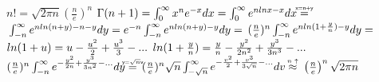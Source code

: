\documentclass[letterpaper,17pt]{article}
\newcommand\myeq{\mathrel{\overset{\makebox[0pt]{\mbox{\normalfont\tiny\sffamily x=n+y}}}{=}}}
\newcommand\nyeq{\mathrel{\overset{\makebox[0pt]{\mbox{\normalfont\tiny\sffamily y=$\sqrt{n}$v}}}{=}}}
\newcommand\oyeq{\mathrel{\overset{\makebox[0pt]{\mbox{\normalfont\tiny\sffamily $n\uparrow$}}}{\approx}}}
\begin{document}
$n!=\sqrt{2 \pi n}\left( \frac{n}{e} \right)^{n}$
$\\ \\ \Gamma(n+1)=\int_{0}^{ \infty} x^{n}e^{-x} dx=\int_{0}^{ \infty} e^{nlnx-x}dx \myeq$
$\\ \\ \int_{-n}^{\infty} e^{nln(n+y)-n-y}dy=e^{-n} \int_{-n}^{\infty} e^{nln(n+y)-y}dy=$
$ \\ \\ (\frac{n}{e})^{n}\int_{-n}^{\infty} e^{nln(1+\frac{y}{n})-y}dy=$
$\\ \\ ln(1+u)=u-\frac{u^{2}}{2}+\frac{u^{3}}{3}-...$
$\\ \\ ln(1+\frac{y}{n})=\frac{y}{n}-\frac{y^{2}}{2n^{2}}+\frac{y^{3}}{3n^{3}}-...$
$ \\ \\ (\frac{n}{e})^{n}\int_{-n}^{\infty} e^{ -\frac{y^{2}}{2n}+\frac{y^{3}}{3n^{2}}-...}dy  \nyeq$
$ \\ \\ (\frac{n}{e})^{n}\sqrt{n} \int_{-\sqrt{n}}^{\infty} e^{ -\frac{v^{2}}{2}+\frac{v^{3}}{3\sqrt{n}}-...}dv  \oyeq$
$\\ \\ \left( \frac{n}{e} \right)^{n} \sqrt{2 \pi n}$
\end{document}

